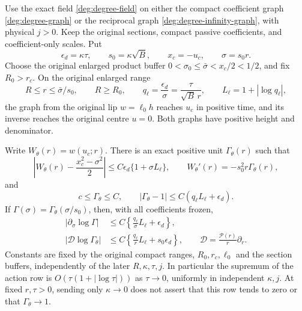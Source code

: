 \begin{lemma}\label{deg:lem-growing-landing-direct}
Use the exact field \eqref{deg:degree-field} on either the compact
coefficient graph \eqref{deg:degree-graph} or the reciprocal graph
\eqref{deg:degree-infinity-graph}, with physical \(j>0\).
Keep the original sections, compact passive coefficients, and
coefficient-only scales. Put
\[
 \epsilon_d=\kappa\tau,\qquad s_0=\kappa\sqrt B,\qquad
 x_c=-u_c,\qquad \sigma=s_0r .
\]
Choose the original enlarged product buffer
\(0<\sigma_0\le\bar\sigma<x_c/2<1/2\), and fix
\(R_0>r_c\). On the original enlarged range
\begin{equation}\label{deg:landing-direct-domain}
 R\le r\le\bar\sigma/s_0,\qquad R\ge R_0,\qquad
 q_\ell=\frac{\epsilon_d}{\sigma}=\frac{\tau}{\sqrt B\,r},
 \qquad L_\ell=1+|\log q_\ell|,
\end{equation}
the graph from the original lip \(w=\ell_0h\) reaches \(u_c\)
in positive time, and its inverse reaches the original centre
\(u=0\). Both graphs have positive height and denominator.

Write \(W_\theta(r)=w(u_c;r)\). There is an exact positive unit
\(\Gamma_\theta(r)\) such that
\begin{equation}\label{deg:landing-direct-value}
 \left|W_\theta(r)-\frac{x_c^2-\sigma^2}{2}\right|
 \le C\epsilon_d\{1+\sigma L_\ell\},\qquad
 W_\theta'(r)=-s_0^2r\Gamma_\theta(r),
\end{equation}
and
\begin{equation}\label{deg:landing-direct-gamma-unit}
 c\le\Gamma_\theta\le C,\qquad
 |\Gamma_\theta-1|\le C(q_\ell L_\ell+\epsilon_d).
\end{equation}
If \(\Gamma(\sigma)=\Gamma_\theta(\sigma/s_0)\), then, with all
coefficients frozen,
\begin{equation}\label{deg:landing-direct-first-row}
 \begin{aligned}
 |\partial_\sigma\log\Gamma|
 &\le C\left\{\frac{q_\ell}{\sigma}L_\ell+\epsilon_d\right\},\\
 |\mathcal D\log\Gamma_\theta|
 &\le C\left\{\frac{q_\ell}{r}L_\ell+s_0\epsilon_d\right\},
 \qquad \mathcal D=\frac{\mathcal P(r)}r\partial_r .
 \end{aligned}
\end{equation}
Constants are fixed by the original compact ranges, \(R_0,r_c,\ell_0\)
and the section buffers, independently of the later \(R,\kappa,\tau,j\).
In particular the supremum of the action row is
\(O(\tau(1+|\log\tau|))\) as \(\tau\to0\), uniformly in independent
\(\kappa,j\). At fixed \(r,\tau>0\), sending only \(\kappa\to0\)
does not assert that this row tends to zero or that \(\Gamma_\theta\to1\).
\end{lemma}

